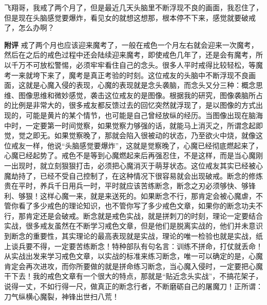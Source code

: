 \begin{case}
    飞翔哥，我戒了两个月了，但是最近几天头脑里不断浮现不良的画面，我忍住了，但是现在头脑感觉要爆炸，看见女的就想这想那，根本停不下来，感觉就要破戒了，怎么办啊？

    \textbf{附评} 戒了两个月也应该迎来魔考了，一般在戒色一个月左右就会迎来一次魔考，然后在之后的戒色过程中还会陆续迎来魔考，即使戒色几年了，还是会有魔考，所以千万不可放松警惕，必须牢牢看住自己的念头。很多人平时戒得比较轻松，等魔考一来就垮下来了，魔考是真正考验的时刻。这位戒友的头脑中不断浮现不良画面，这就是心魔入侵的表现，心魔的表现就是念头袭脑，而念头又分三种：概念思维、图像思维和微妙感觉，袭击这位戒友的是图像。根据我的研究，图像袭脑所占的比例是非常大的，很多戒友都反馈过去的回忆突然就浮现了，是以图像的方式出现的，可能是黄片的某个情节，也可能是自己曾经放纵的经历。当图像出现在脑海中时，一定要第一时间觉察，如果觉察力够强的话，就能马上消灭之，所谓念起即觉，觉之即无。如果觉察晚了，那就会陷入很被动的状态，乃至欲火中烧，就像这位戒友一样，他说“头脑感觉要爆炸”，这就是觉察晚了，心魔已经彻底燃起来了，心魔已经起势了。戒色不是等到心魔燃起来后再强忍住，不是这样，而是当心魔刚一出现时，就立刻狠狠打击，必须把心魔消灭于萌芽状态。这位戒友其实已经被心魔劫持了，已经不受自己控制了，在这种情况下很容易就会出现破戒。断念的修炼贵在平时，养兵千日用兵一时，平时就应该苦练断念，断念之刃必须够快、够锋利、够狠！这样心魔一来，就是来送死的。如果断念不行，那肯定会被心魔虐，不管你看了多少戒色的理论知识，也不管你写了多少戒色文章，如果你的断念功夫不行，那肯定还是会破戒。断念就是戒色实战，就是拼刺刀的时刻，理论一定要结合实战，很多戒友虽然在不断学习戒色文章，但是他们是脱离实战的，他们并未意识到断念的重要性，其实理论的最高表现就是实战，理论的唯一检验也就是实战，纸上谈兵要不得，一定要苦练断念！特种部队有句名言：训练不拼命，打仗就丢命！从实战出发来学习戒色文章，以实战的标准来练习断念，唯一可以确定的是，心魔肯定会再次进攻，而你所要做的就是拼命练习断念，当心魔入侵时，一定要把心魔干下去！我的戒色文章有一个很大的特点，那就是“贴近念头实战”，不搞花架子，说得一丈，不如行得一尺，做真正的断念行者，不断磨砺自己的屠魔刀！正所谓：刀气纵横心魔裂，神锋出世扫八荒！
\end{case}

